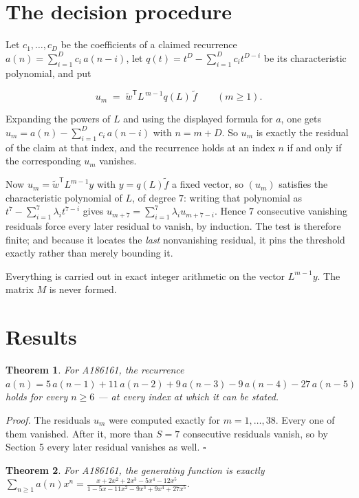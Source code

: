 \documentclass[11pt]{article}
\newtheorem{theorem}{Theorem}
\theoremstyle{definition}
\begin{document}
\section{The decision procedure}

Let $c_1,\dots,c_D$ be the coefficients of a claimed recurrence $a(n) = \sum_{i=1}^{D} c_i\,a(n-i)$, let $q(t) = t^{D} - \sum_{i=1}^{D} c_i t^{D-i}$ be its characteristic polynomial, and put

\[u_m \;=\; \tilde w^{\mathsf T} L^{\,m-1} q(L)\,\tilde f \qquad (m \ge 1).\]

Expanding the powers of $L$ and using the displayed formula for $a$, one gets $u_m = a(n) - \sum_{i=1}^{D} c_i\,a(n-i)$ with $n = m + D$. So $u_m$ is exactly the residual of the claim at that index, and the recurrence holds at an index $n$ if and only if the corresponding $u_m$ vanishes.

Now $u_m = \tilde w^{\mathsf T} L^{m-1} y$ with $y = q(L)\tilde f$ a fixed vector, so $(u_m)$ satisfies the characteristic polynomial of $L$, of degree $7$: writing that polynomial as $t^{7} - \sum_{i=1}^{7} \lambda_i t^{7-i}$ gives $u_{m+7} = \sum_{i=1}^{7} \lambda_i u_{m+7-i}$. Hence $7$ consecutive vanishing residuals force every later residual to vanish, by induction. The test is therefore finite; and because it locates the {\itshape last} nonvanishing residual, it pins the threshold exactly rather than merely bounding it.

Everything is carried out in exact integer arithmetic on the vector $L^{m-1}y$. The matrix $M$ is never formed.

\section{Results}

\begin{theorem} For A186161, the recurrence $a(n) = 5\,a(n-1) + 11\,a(n-2) + 9\,a(n-3) - 9\,a(n-4) - 27\,a(n-5)$ holds for every $n \ge 6$ --- at every index at which it can be stated.\end{theorem}

{\itshape Proof.} The residuals $u_m$ were computed exactly for $m = 1,\dots,38$. Every one of them vanished. After it, more than $S = 7$ consecutive residuals vanish, so by Section 5 every later residual vanishes as well. $\square$

\begin{theorem} For A186161, the generating function is exactly $\sum_{n\ge 1} a(n)x^n = \frac{x + 2x^{2} + 2x^{3} - 5x^{4} - 12x^{5}}{1 - 5x - 11x^{2} - 9x^{3} + 9x^{4} + 27x^{5}}$.\end{theorem}
\end{document}
